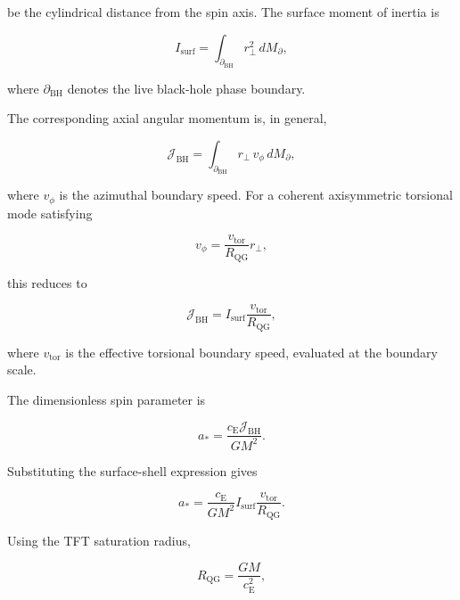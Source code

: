 be the cylindrical distance from the spin axis. The surface moment of inertia is

\begin{equation}
    I_{\mathrm{surf}}
    =
    \int_{\partial_{\mathrm{BH}}}
    r_\perp^2\,dM_{\partial},
\end{equation}

where \(\partial_{\mathrm{BH}}\) denotes the live black-hole phase boundary.

The corresponding axial angular momentum is, in general,

\begin{equation}
    \mathcal{J}_{\mathrm{BH}}
    =
    \int_{\partial_{\mathrm{BH}}}
    r_\perp\,v_{\phi}\,dM_{\partial},
\end{equation}

where \(v_{\phi}\) is the azimuthal boundary speed. For a coherent axisymmetric torsional mode satisfying

\begin{equation}
    v_{\phi}
    =
    \frac{v_{\mathrm{tor}}}{R_{\mathrm{QG}}}r_\perp,
\end{equation}

this reduces to

\begin{equation}
    \mathcal{J}_{\mathrm{BH}}
    =
    I_{\mathrm{surf}}
    \frac{v_{\mathrm{tor}}}{R_{\mathrm{QG}}},
\end{equation}

where \(v_{\mathrm{tor}}\) is the effective torsional boundary speed, evaluated at the boundary scale.

The dimensionless spin parameter is

\begin{equation}
    a_\ast
    =
    \frac{c_{\mathrm{E}}\mathcal{J}_{\mathrm{BH}}}{GM^2}.
\end{equation}

Substituting the surface-shell expression gives

\begin{equation}
    a_\ast
    =
    \frac{c_{\mathrm{E}}}{GM^2}
    I_{\mathrm{surf}}
    \frac{v_{\mathrm{tor}}}{R_{\mathrm{QG}}}.
\end{equation}

Using the TFT saturation radius,

\begin{equation}
    R_{\mathrm{QG}}
    =
    \frac{GM}{c_{\mathrm{E}}^2},
\end{equation}

